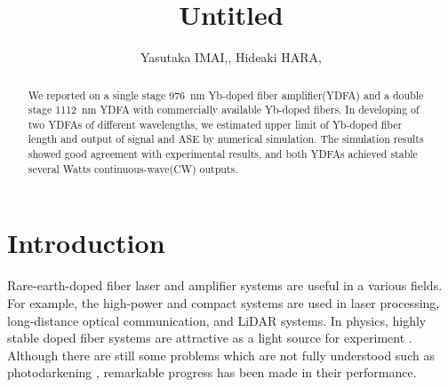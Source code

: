 \documentclass{osa-article}
\begin{document}
\title{Untitled}

\author{Yasutaka IMAI,, Hideaki HARA,}

\address{Reserch Institute for Interdisciplinary Science, Okayama University, Okayama, Japan}

\begin{abstract}
We reported on a single stage \SI{976}{nm} Yb-doped fiber amplifier(YDFA) and a double stage \SI{1112}{nm} YDFA with commercially available Yb-doped fibers.
In developing of two YDFAs of different wavelengths, we estimated upper limit of Yb-doped fiber length and output of signal and ASE by numerical simulation.
The simulation results showed good agreement with experimental results, and both YDFAs achieved stable several Watts continuous-wave(CW) outputs.
\end{abstract}

\listoftodos
\section{Introduction}
Rare-earth-doped fiber laser and amplifier systems are useful in a various fields.
For example, the high-power and compact systems are used in laser processing, long-distance optical communication, and LiDAR systems.
In physics, highly stable doped fiber systems are attractive as a light source for experiment \cite{burkley2017yb, coluccelli2016optical}.
Although there are still some problems which are not fully understood such as photodarkening \cite{paschotta1997lifetime}, remarkable progress has been made in their performance.
\end{document}
